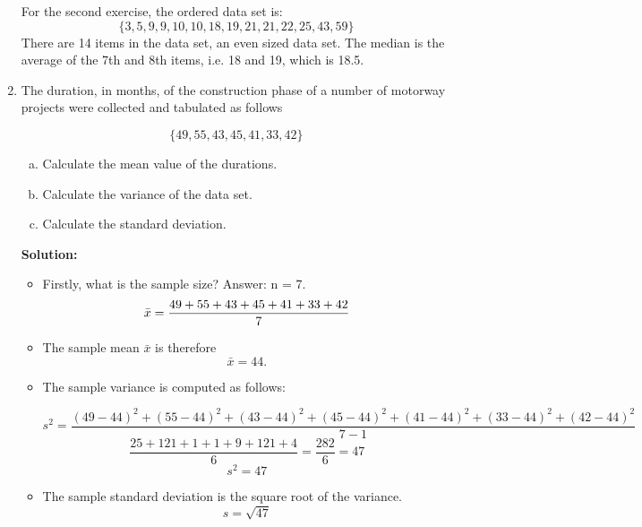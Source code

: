 \documentclass[a4paper,12pt]{article}
\begin{document}
\begin{enumerate}
For the second exercise, the ordered data set is:
\[ \{3, 5, 9, 9, 10, 10, 18, 19, 21, 21, 22, 25, 43, 59\}\]
There are 14 items in the data set, an even sized data set. The median is the average of the 7th and 8th items, i.e. 18 and 19, which is 18.5.


\item 
	The duration, in months, of the construction phase of a number of motorway projects
	were collected and tabulated as follows
	
	\[ \{49, 55, 43, 45, 41, 33, 42 \} \]
	\begin{enumerate}[(a)]
	\item Calculate the mean value of the durations.
	\item Calculate the variance of the data set.
	\item Calculate the standard deviation.
	\end{enumerate}
	
\noindent \textbf{Solution:}
\begin{itemize}
    \item Firstly, what is the sample size? Answer: n = 7.
    \[ \bar{x} = {49 + 55 + 43 + 45 + 41 +33 + 42 \over 7} \]

	
	
	
	
	
\item The sample mean $\bar{x}$ is therefore	
	\[\bar{x} = 44.\]

\item The sample variance is computed as follows:
	
	\[s^2  = \frac{(49-44)^2 + (55-44)^2 + (43-44)^2 + (45-44)^2 + (41-44)^2 + (33-44)^2 + (42-44)^2} { 7-1}\]
	\[
	\frac{25 + 121 + 1 + 1 + 9 + 121 + 4}{6}
	= \frac{282}{6} = 47\]
	\[s^2 = 47\]	
\item The sample standard deviation is the square root of the variance.	
	\[s = \sqrt{47}\]
	

\end{itemize}
	

	
\end{enumerate}
\end{document}
